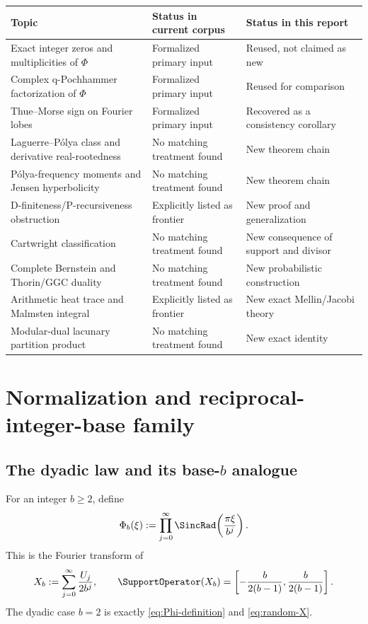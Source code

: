\documentclass[11pt]{article}
\theoremstyle{definition}
\theoremstyle{remark}
\begin{document}
\begin{longtable}{@{}L{0.31\textwidth}L{0.23\textwidth}L{0.39\textwidth}@{}}
\toprule
Topic & Status in current corpus & Status in this report \\
\midrule
\endhead
Exact integer zeros and multiplicities of \(\Phi\) & Formalized primary input & Reused, not claimed as new \\
Complex q-Pochhammer factorization of \(\Phi\) & Formalized primary input & Reused for comparison \\
Thue--Morse sign on Fourier lobes & Formalized primary input & Recovered as a consistency corollary \\
Laguerre--P\'olya class and derivative real-rootedness & No matching treatment found & New theorem chain \\
P\'olya-frequency moments and Jensen hyperbolicity & No matching treatment found & New theorem chain \\
D-finiteness/P-recursiveness obstruction & Explicitly listed as frontier & New proof and generalization \\
Cartwright classification & No matching treatment found & New consequence of support and divisor \\
Complete Bernstein and Thorin/GGC duality & No matching treatment found & New probabilistic construction \\
Arithmetic heat trace and Malmsten integral & Explicitly listed as frontier & New exact Mellin/Jacobi theory \\
Modular-dual lacunary partition product & No matching treatment found & New exact identity \\
\bottomrule
\end{longtable}

\section{Normalization and reciprocal-integer-base family}

\subsection{The dyadic law and its \texorpdfstring{base-\(b\)}{base-b} analogue}

For an integer \(b\ge2\), define
\begin{equation}\label{eq:Phi-b}
  \Phi_b(\xi):=\prod_{j=0}^{\infty}\SincRad\!\left(\frac{\pi\xi}{b^j}\right).
\end{equation}
This is the Fourier transform of
\begin{equation}\label{eq:Xb}
  X_b:=\sum_{j=0}^{\infty}\frac{U_j}{2b^j},
  \qquad
  \SupportOperator (X_b)=
  \left[-\frac{b}{2(b-1)},\frac{b}{2(b-1)}\right].
\end{equation}
The dyadic case \(b=2\) is exactly \eqref{eq:Phi-definition} and \eqref{eq:random-X}.
\end{document}
